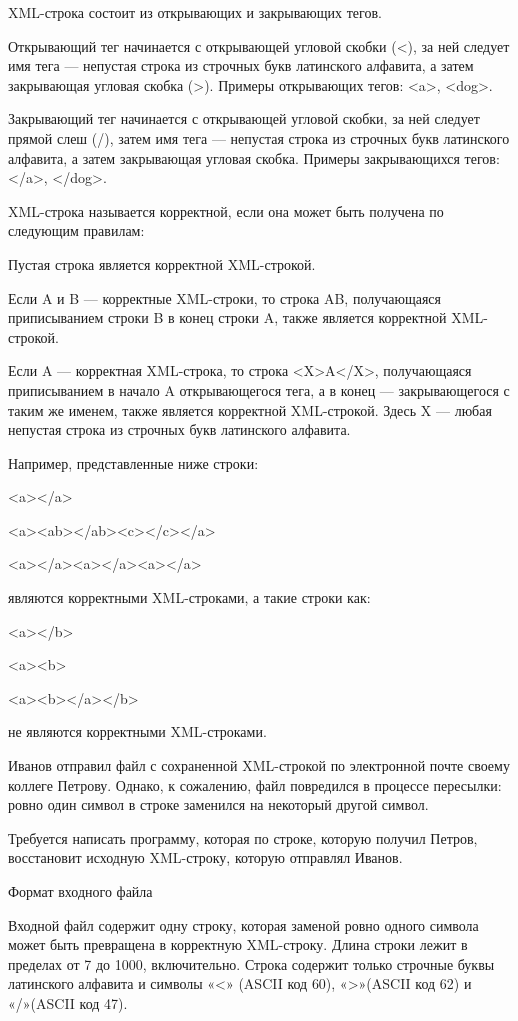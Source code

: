 \documentclass[]{article}
\begin{document}
\begin{enumerate}
XML-строка состоит из открывающих и закрывающих тегов.

Открывающий тег начинается с открывающей угловой скобки (<), за ней следует имя тега — непустая строка из строчных букв латинского алфавита, а затем закрывающая угловая скобка (>). Примеры открывающих тегов: <a>, <dog>.

Закрывающий тег начинается с открывающей угловой скобки, за ней следует прямой слеш (/), затем имя тега — непустая строка из строчных букв латинского алфавита, а затем закрывающая угловая скобка. Примеры закрывающихся тегов: </a>, </dog>.

XML-строка называется корректной, если она может быть получена по следующим правилам:

    Пустая строка является корректной XML-строкой.

    Если A и B — корректные XML-строки, то строка AB, получающаяся приписыванием строки B в конец строки A, также является корректной XML-строкой.

    Если A — корректная XML-строка, то строка <X>A</X>, получающаяся приписыванием в начало A открывающегося тега, а в конец — закрывающегося с таким же именем, также является корректной XML-строкой. Здесь X — любая непустая строка из строчных букв латинского алфавита.

Например, представленные ниже строки:

<a></a>

<a><ab></ab><c></c></a>

<a></a><a></a><a></a>

являются корректными XML-строками, а такие строки как:

<a></b>

<a><b>

<a><b></a></b>

не являются корректными XML-строками.

Иванов отправил файл с сохраненной XML-строкой по электронной почте своему коллеге Петрову. Однако, к сожалению, файл повредился в процессе пересылки: ровно один символ в строке заменился на некоторый другой символ.

Требуется написать программу, которая по строке, которую получил Петров, восстановит исходную XML-строку, которую отправлял Иванов.

Формат входного файла

Входной файл содержит одну строку, которая заменой ровно одного символа может быть превращена в корректную XML-строку. Длина строки лежит в пределах от 7 до 1000, включительно. Строка содержит только строчные буквы латинского алфавита и символы «<» (ASCII код 60), «>»(ASCII код 62) и «/»(ASCII код 47).


\end{enumerate}
\end{document}
